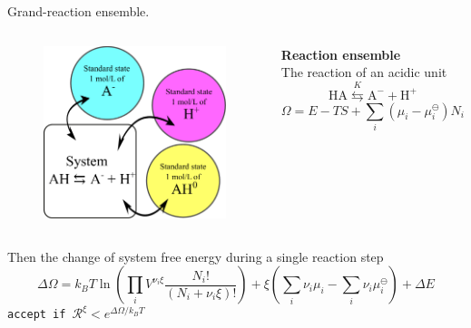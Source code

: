 \documentclass[10pt]{beamer}
\begin{document}
{

\begin{frame}{Grand-reaction ensemble.}

	\begin{columns}[T,onlytextwidth]%
			\begin{figure}
				\includegraphics[height=4.cm]{figures/standard_states.pdf}
			\end{figure} 
			\textbf{Reaction ensemble}\\ 
			\vspace{1cm}
			The reaction of an acidic unit 
			\begin{equation*}
				\mathrm{HA}\stackrel{K}{\leftrightarrows}\mathrm{A^-}+\mathrm{H^+}\label{eq: acid reaction}
			\end{equation*}
			\begin{equation*}
				\Omega=E-TS+\sum_i\left(\mu_i-\mu^\ominus_i\right) N_i\label{eq:Omega-RE}
			\end{equation*}
	\end{columns} %
	\vspace{1cm}
	Then the change of system free energy during a single reaction step
	\begin{equation*}
		\Delta\Omega=k_BT\ln\left(\prod_i V^{\nu_i\xi}\frac{N_i!}{\left(N_i+\nu_i\xi\right)!}\right)+
		\xi\left(\sum_i\nu_i\mu_i-\sum_i\nu_i\mu_i^\ominus\right)+\Delta E
		\label{eq: DeltaG RE one}
	\end{equation*}
	{\tt accept if $\mathcal{R}^{\xi}<e^{\Delta\Omega/k_BT}$}
\end{frame}
}
\end{document}
